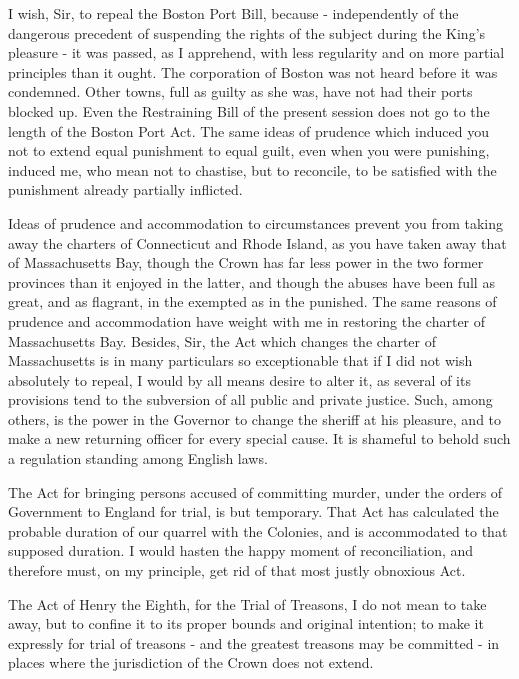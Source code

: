 I wish, Sir, to repeal the Boston Port Bill, because - independently of the dangerous precedent of suspending the rights of the subject during the King’s pleasure - it was passed, as I apprehend, with less regularity and on more partial principles than it ought. The corporation of Boston was not heard before it was condemned. Other towns, full as guilty as she was, have not had their ports blocked up. Even the Restraining Bill of the present session does not go to the length of the Boston Port Act. The same ideas of prudence which induced you not to extend equal punishment to equal guilt, even when you were punishing, induced me, who mean not to chastise, but to reconcile, to be satisfied with the punishment already partially inflicted.\par

Ideas of prudence and accommodation to circumstances prevent you from taking away the charters of Connecticut and Rhode Island, as you have taken away that of Massachusetts Bay, though the Crown has far less power in the two former provinces than it enjoyed in the latter, and though the abuses have been full as great, and as flagrant, in the exempted as in the punished. The same reasons of prudence and accommodation have weight with me in restoring the charter of Massachusetts Bay. Besides, Sir, the Act which changes the charter of Massachusetts is in many particulars so exceptionable that if I did not wish absolutely to repeal, I would by all means desire to alter it, as several of its provisions tend to the subversion of all public and private justice. Such, among others, is the power in the Governor to change the sheriff at his pleasure, and to make a new returning officer for every special cause. It is shameful to behold such a regulation standing among English laws.\par

The Act for bringing persons accused of committing murder, under the orders of Government to England for trial, is but temporary. That Act has calculated the probable duration of our quarrel with the Colonies, and is accommodated to that supposed duration. I would hasten the happy moment of reconciliation, and therefore must, on my principle, get rid of that most justly obnoxious Act.\par

The Act of Henry the Eighth, for the Trial of Treasons, I do not mean to take away, but to confine it to its proper bounds and original intention; to make it expressly for trial of treasons - and the greatest treasons may be committed - in places where the jurisdiction of the Crown does not extend.\par

